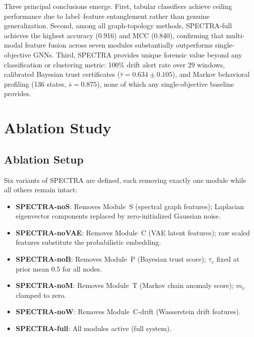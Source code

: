 \documentclass[journal]{IEEEtran}
\newcommand{\spectra}{\textsc{SPECTRA}}
\begin{document}
Three principal conclusions emerge.
First, tabular classifiers achieve ceiling performance due to label--feature
entanglement rather than genuine generalization.
Second, among all graph-topology methods, \spectra-full achieves the highest
accuracy (\num{0.916}) and MCC (\num{0.840}), confirming that multi-modal
feature fusion across seven modules substantially outperforms single-objective
GNNs.
Third, \spectra{} provides unique forensic value beyond any classification
or clustering metric: 100\% drift alert rate over \num{29} windows, calibrated
Bayesian trust certificates ($\bar{\tau} = \num{0.634} \pm \num{0.105}$), and
Markov behavioral profiling (\num{136} states, $\bar{s} = \num{0.875}$), none
of which any single-objective baseline provides.

\FloatBarrier
\section{Ablation Study}
\label{sec:ablation}

\subsection{Ablation Setup}
\label{subsec:ablation_setup}

Six variants of \spectra{} are defined, each removing exactly one module
while all others remain intact:

\begin{itemize}[leftmargin=*, itemsep=2pt]
  \item \textbf{\spectra-noS}: Removes Module~S (spectral graph features);
    Laplacian eigenvector components replaced by zero-initialized Gaussian noise.
  \item \textbf{\spectra-noVAE}: Removes Module~C (VAE latent features);
    raw scaled features substitute the probabilistic embedding.
  \item \textbf{\spectra-noB}: Removes Module~P (Bayesian trust score);
    $\tau_v$ fixed at prior mean $0.5$ for all nodes.
  \item \textbf{\spectra-noM}: Removes Module~T (Markov chain anomaly score);
    $m_v$ clamped to zero.
  \item \textbf{\spectra-noW}: Removes Module~C-drift (Wasserstein drift features).
  \item \textbf{\spectra-full}: All modules active (full system).
\end{itemize}
\end{document}
